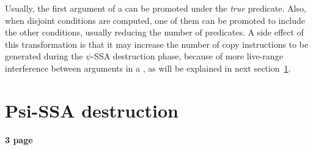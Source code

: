 \begin{itemize}



Usually, the first argument of a \psifun can be promoted
under the \textit{true} predicate. Also, when disjoint conditions are
computed, one of them can be promoted to include the other conditions,
usually reducing the number of predicates. A side effect of this
transformation is that it may increase the number of copy instructions
to be generated during the $\psi$-SSA destruction phase, because of
more live-range interference between arguments in a \psifun,
as will be explained in next section~\ref{sec:Psi_ssa_destruction}.

\end{itemize}

\section{Psi-SSA destruction}
\label{sec:Psi_ssa_destruction}

\textbf{3 page}


